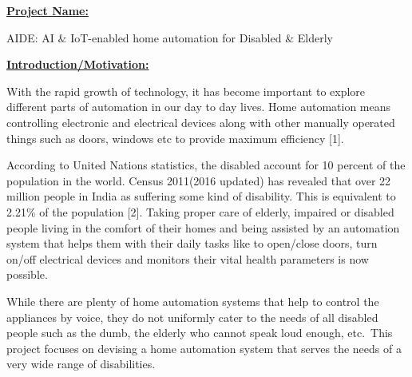 \documentclass[12pt]{article}
\begin{document}
\tab  {}\par

\setlength{\parskip}{8.04pt}
{\fontsize{14pt}{16.8pt}\selectfont \textbf{\uline{Project Name:\tab }}\par}\par

AIDE: AI $\&$  IoT-enabled home automation for Disabled $\&$  Elderly\par


\vspace{\baselineskip}
{\fontsize{14pt}{16.8pt}\selectfont \textbf{\uline{Introduction/Motivation:}}\par}\par

\begin{justify}
With the rapid growth of technology, it has become important to explore different parts of automation in our day to day lives. Home automation means controlling electronic and electrical devices along with other manually operated things such as doors, windows etc to provide maximum efficiency [1]. 
\end{justify}\par

\begin{justify}
According to United Nations statistics, the disabled account for 10 percent of the population in the world. Census 2011(2016 updated) has revealed that over 22 million people in India as suffering some kind of disability. This is equivalent to 2.21$\%$  of the population [2]. Taking proper care of elderly, impaired or disabled people living in the comfort of their homes and being assisted by an automation system that helps them with their daily tasks like to open/close doors, turn on/off electrical devices and monitors their vital health parameters is now possible.
\end{justify}\par

\begin{justify}
While there are plenty of home automation systems that help to control the appliances by voice, they do not uniformly cater to the needs of all disabled people such as the dumb, the elderly who cannot speak loud enough, etc. This project focuses on devising a home automation system that serves the needs of a very wide range of disabilities. 
\end{justify}\par
\end{document}
